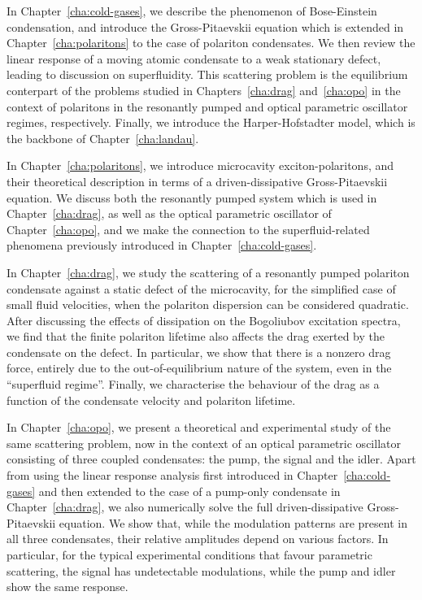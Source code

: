 In Chapter~\ref{cha:cold-gases}, we describe the phenomenon of
Bose-Einstein condensation, and introduce the Gross-Pitaevskii
equation which is extended in Chapter~\ref{cha:polaritons} to the case
of polariton condensates. We then review the linear response of a
moving atomic condensate to a weak stationary defect, leading to
discussion on superfluidity. This scattering problem is the
equilibrium conterpart of the problems studied in
Chapters~\ref{cha:drag} and~\ref{cha:opo} in the context of polaritons
in the resonantly pumped and optical parametric oscillator regimes,
respectively. Finally, we introduce the Harper-Hofstadter model, which
is the backbone of Chapter~\ref{cha:landau}.

In Chapter~\ref{cha:polaritons}, we introduce microcavity
exciton-polaritons, and their theoretical description in terms of a
driven-dissipative Gross-Pitaevskii equation. We discuss both the
resonantly pumped system which is used in Chapter~\ref{cha:drag}, as
well as the optical parametric oscillator of Chapter~\ref{cha:opo},
and we make the connection to the superfluid-related phenomena
previously introduced in Chapter~\ref{cha:cold-gases}.

In Chapter~\ref{cha:drag}, we study the scattering of a resonantly
pumped polariton condensate against a static defect of the
microcavity, for the simplified case of small fluid velocities, when
the polariton dispersion can be considered quadratic. After discussing
the effects of dissipation on the Bogoliubov excitation spectra, we
find that the finite polariton lifetime also affects the drag exerted
by the condensate on the defect. In particular, we show that there is
a nonzero drag force, entirely due to the out-of-equilibrium nature of
the system, even in the ``superfluid regime''. Finally, we
characterise the behaviour of the drag as a function of the condensate
velocity and polariton lifetime.

In Chapter~\ref{cha:opo}, we present a theoretical and experimental
study of the same scattering problem, now in the context of an optical
parametric oscillator consisting of three coupled condensates: the
pump, the signal and the idler. Apart from using the linear response
analysis first introduced in Chapter~\ref{cha:cold-gases} and then
extended to the case of a pump-only condensate in
Chapter~\ref{cha:drag}, we also numerically solve the full
driven-dissipative Gross-Pitaevskii equation. We show that, while the
modulation patterns are present in all three condensates, their
relative amplitudes depend on various factors. In particular, for the
typical experimental conditions that favour parametric scattering, the
signal has undetectable modulations, while the pump and idler show the
same response.

